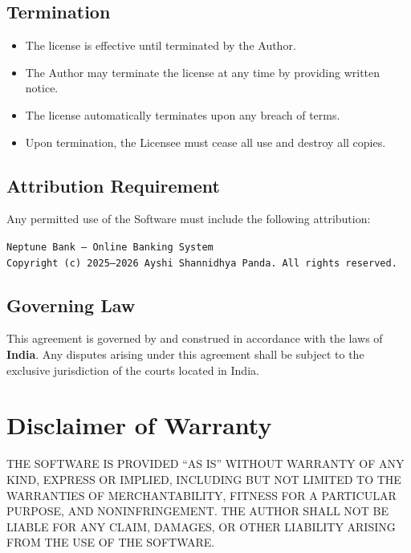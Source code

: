 \documentclass[12pt,a4paper]{report}
\begin{document}
\subsection{Termination}
\begin{itemize}[leftmargin=*]
    \item The license is effective until terminated by the Author.
    \item The Author may terminate the license at any time by providing written notice.
    \item The license automatically terminates upon any breach of terms.
    \item Upon termination, the Licensee must cease all use and destroy all copies.
\end{itemize}

\subsection{Attribution Requirement}
Any permitted use of the Software must include the following attribution:

\begin{tcolorbox}[colback=neptuneblue!5, colframe=neptuneblue!50, arc=3pt]
\texttt{Neptune Bank -- Online Banking System}\\
\texttt{Copyright (c) 2025--2026 Ayshi Shannidhya Panda. All rights reserved.}
\end{tcolorbox}

\subsection{Governing Law}
This agreement is governed by and construed in accordance with the laws of \textbf{India}. Any disputes arising under this agreement shall be subject to the exclusive jurisdiction of the courts located in India.

\section{Disclaimer of Warranty}

\begin{warnbox}[No Warranty]
THE SOFTWARE IS PROVIDED ``AS IS'' WITHOUT WARRANTY OF ANY KIND, EXPRESS OR IMPLIED, INCLUDING BUT NOT LIMITED TO THE WARRANTIES OF MERCHANTABILITY, FITNESS FOR A PARTICULAR PURPOSE, AND NONINFRINGEMENT. THE AUTHOR SHALL NOT BE LIABLE FOR ANY CLAIM, DAMAGES, OR OTHER LIABILITY ARISING FROM THE USE OF THE SOFTWARE.
\end{warnbox}
\end{document}
